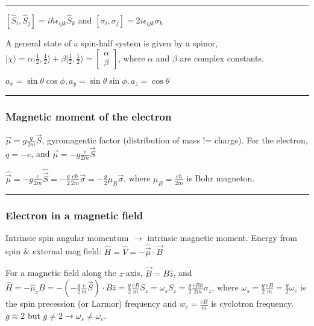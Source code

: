\hrule height 0.05pt

$[\widehat{S}_i, \widehat{S}_j] = i \hbar \epsilon_{ijk} \widehat{S}_k$ and $[\sigma_i, \sigma_j] = 2 i \epsilon_{ijk} \sigma_k$

A general state of a spin-half system is given by a spinor, $|\chi \rangle = \alpha | \frac{1}{2}, \frac{1}{2} \rangle + \beta | \frac{1}{2}, \frac{1}{2} \rangle = \begin{bmatrix} \alpha \\ \beta \end{bmatrix}$, where $\alpha$ and $\beta$ are complex constants.

$a_x = \sin \theta \cos \phi, a_y = \sin \theta \sin \phi, a_z = \cos \theta$


\hrule height 0.05pt

\subsubsection{Magnetic moment of the electron}
$\vec{\mu} = g \frac{q}{2m} \vec{S}$, gyromagentic factor (distribution of mass != charge).
For the electron, $q=-e$, and $\vec{\mu} = -g \frac{e}{2m} \vec{S}$

$\widehat{\vec{\mu}} = -g \frac{e}{2m} \widehat{\vec{S}} = -\frac{g}{2} \frac{e \hbar}{2m} \vec{\sigma} = - \frac{g}{2} \mu_B \vec{\sigma}$, where $\mu_B = \frac{e \hbar}{2m}$ is Bohr magneton.

\hrule height 0.05pt

\subsubsection{Electron in a magnetic field}

Intrinsic spin angular momentum $\rightarrow$ intrinsic magnetic moment. Energy from spin \& external mag field: $\widehat{H} = \widehat{V} = -\widehat{\vec{\mu}} \cdot \vec{B}$

For a magnetic field along the $z$-axis, $\vec{B} = B \widehat{z}$, and $\widehat{H} = -\widehat{\mu}_z B = -(-\frac{g}{2} \frac{e}{m} \vec{S}) \cdot B \widehat{z} = \frac{g}{2} \frac{eB}{m} S_z = \omega_s S_z = \frac{g}{2} \frac{eB\hbar}{2m} \sigma_z$, where $\omega_s = \frac{g}{2} \frac{eB}{m} = \frac{g}{2} \omega_c$ is the spin precession (or Larmor) frequency and $w_c = \frac{e B}{m}$ is cyclotron frequency. $g \approx 2$ but $g \neq 2 \rightarrow \omega_s \neq \omega_c$.

